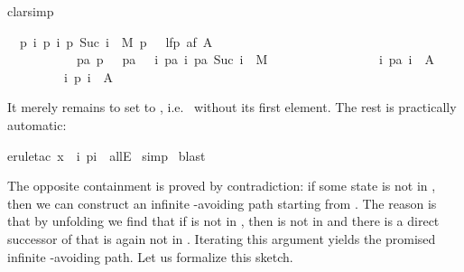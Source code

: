 \begin{isabellebody}
clarsimp{\isacharparenright}%
\begin{isamarkuptxt}%
\begin{isabelle}
\ \ {\isasymAnd}p{\isachardot}\ {\isasymlbrakk}{\isasymforall}i{\isachardot}\ {\isacharparenleft}p\ i{\isacharcomma}\ p\ {\isacharparenleft}Suc\ i{\isacharparenright}{\isacharparenright}\ {\isasymin}\ M{\isacharsemicolon}\ p\ \ {\isasymin}\ lfp\ {\isacharparenleft}af\ A{\isacharparenright}{\isacharsemicolon}\isanewline
\ \ \ \ \ \ \ \ \ \ \ {\isasymforall}pa{\isachardot}\ p\ \ {\isacharequal}\ pa\ \ {\isasymand}\ {\isacharparenleft}{\isasymforall}i{\isachardot}\ {\isacharparenleft}pa\ i{\isacharcomma}\ pa\ {\isacharparenleft}Suc\ i{\isacharparenright}{\isacharparenright}\ {\isasymin}\ M{\isacharparenright}\ {\isasymlongrightarrow}\isanewline
\ \ \ \ \ \ \ \ \ \ \ \ \ \ \ \ {\isacharparenleft}{\isasymexists}i{\isachardot}\ pa\ i\ {\isasymin}\ A{\isacharparenright}{\isasymrbrakk}\isanewline
\ \ \ \ \ \ \ \ {\isasymLongrightarrow}\ {\isasymexists}i{\isachardot}\ p\ i\ {\isasymin}\ A
\end{isabelle}
It merely remains to set  to , i.e.\  without its
first element. The rest is practically automatic:%
\end{isamarkuptxt}%
erule{\isacharunderscore}tac\ x\ {\isacharequal}\ {\isachardoublequote}{\isasymlambda}i{\isachardot}\ p{\isacharparenleft}i{\isacharplus}{}{\isacharparenright}{\isachardoublequote}\ \ allE{\isacharparenright}\isanewline
{}\ simp\isanewline
{}\ blast\isanewline
{}%
\begin{isamarkuptext}%
The opposite containment is proved by contradiction: if some state
 is not in , then we can construct an
infinite -avoiding path starting from . The reason is
that by unfolding  we find that if  is not in
, then  is not in  and there is a
direct successor of  that is again not in . Iterating this argument yields the promised infinite
-avoiding path. Let us formalize this sketch.


\end{isamarkuptext}
\end{isabellebody}
